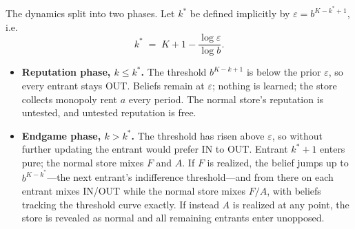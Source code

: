 \begin{center}
\end{center}

The dynamics split into two phases. Let $k^*$ be defined implicitly by $\varepsilon = b^{K - k^* + 1}$, i.e.\
\[
  k^* \;=\; K + 1 - \frac{\log \varepsilon}{\log b}.
\]

\begin{itemize}
  \item \textbf{Reputation phase, $k \le k^*$.} The threshold $b^{K-k+1}$ is below the prior $\varepsilon$, so every entrant stays OUT. Beliefs remain at $\varepsilon$; nothing is learned; the store collects monopoly rent $a$ every period. The normal store's reputation is untested, and untested reputation is free.

  \item \textbf{Endgame phase, $k > k^*$.} The threshold has risen above $\varepsilon$, so without further updating the entrant would prefer IN to OUT. Entrant $k^* + 1$ enters pure; the normal store mixes $F$ and $A$. If $F$ is realized, the belief jumps up to $b^{K-k^*}$---the next entrant's indifference threshold---and from there on each entrant mixes IN/OUT while the normal store mixes $F/A$, with beliefs tracking the threshold curve exactly. If instead $A$ is realized at any point, the store is revealed as normal and all remaining entrants enter unopposed.
\end{itemize}

